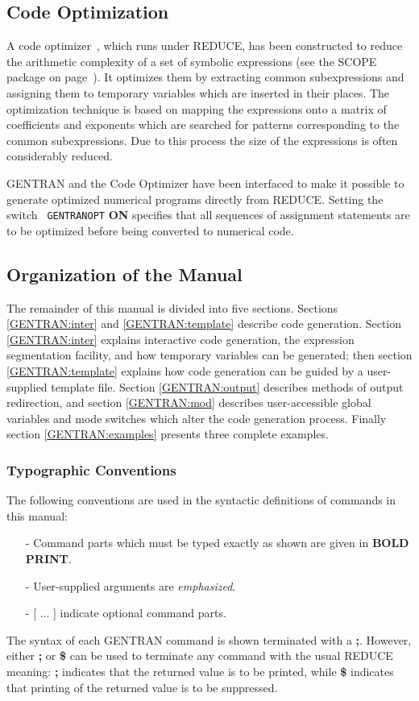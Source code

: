 \subsection{Code Optimization}
A code optimizer~\cite{vanHulzen:89}, which runs under REDUCE, has
been constructed to reduce the arithmetic complexity of a set of
symbolic expressions (see the SCOPE package on
page~\pageref{SCOPE:intro}).  It optimizes them by extracting common
subexpressions and assigning them to temporary variables which are
inserted in their places.  The optimization technique is based on
mapping the expressions onto a matrix of coefficients and exponents
which are searched for patterns corresponding to the common
subexpressions.  Due to this process the size of the expressions is
often considerably reduced.

GENTRAN and the Code Optimizer have been interfaced to make it
possible to generate optimized numerical programs directly
 from REDUCE.  Setting the switch {\tt
GENTRANOPT} {\bf ON} specifies that all sequences of assignment
statements are to be optimized before being converted to numerical
code.

\subsection{Organization of the Manual}
The remainder of this manual is divided into five sections.  Sections
\ref{GENTRAN:inter} and \ref{GENTRAN:template} describe code
generation.  Section \ref{GENTRAN:inter} explains interactive code
generation, the expression segmentation facility, and how temporary
variables can be generated; then section \ref{GENTRAN:template}
explains how code generation can be guided by a user-supplied template
file.  Section \ref{GENTRAN:output} describes methods of output
redirection, and section \ref{GENTRAN:mod} describes user-accessible
global variables and mode switches which alter the code generation
process.  Finally section \ref{GENTRAN:examples} presents three
complete examples.

\subsubsection{Typographic Conventions}
The following conventions are used in the syntactic definitions of
commands in this manual:
\begin{itemize}
\item[{-}]
Command parts which must be typed exactly as shown are given in
{\bf BOLD PRINT}.
\item[{-}]
User-supplied arguments are {\it emphasized}.
\item[{-}]
[ ... ] indicate optional command parts.
\end{itemize}
The syntax of each GENTRAN command is shown terminated with a {\bf ;}.
However, either {\bf ;} or {\bf \$} can be used to terminate any
command with the usual REDUCE meaning:  {\bf ;} indicates that the
returned value is to be printed, while {\bf \$} indicates that printing
of the returned value is to be suppressed.

